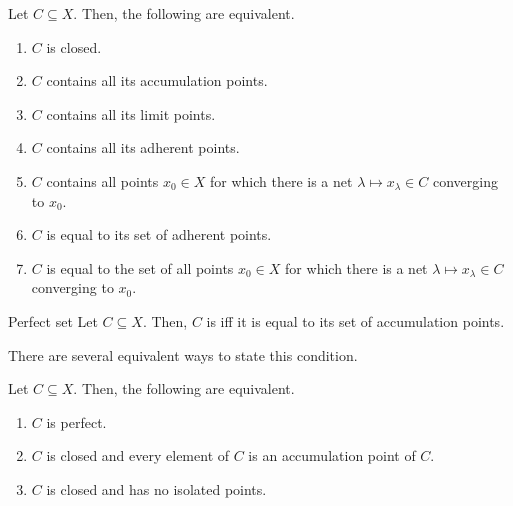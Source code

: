 \begin{thm}{}{}
Let $C\subseteq X$.  Then, the following are equivalent.
\begin{enumerate}
\item $C$ is closed.
\item $C$ contains all its accumulation points.
\item $C$ contains all its limit points.
\item $C$ contains all its adherent points.
\item $C$ contains all points $x_0\in X$ for which there is a net $\lambda \mapsto x_{\lambda}\in C$ converging to $x_0$.
\item $C$ is equal to its set of adherent points.
\item $C$ is equal to the set of all points $x_0\in X$ for which there is a net $\lambda \mapsto x_{\lambda}\in C$ converging to $x_0$.
\end{enumerate}
\end{thm}
\begin{dfn}{Perfect set}{}
Let $C\subseteq X$.  Then, $C$ is  iff it is equal to its set of accumulation points.
\end{dfn}
There are several equivalent ways to state this condition.
\begin{prp}{}{}
Let $C\subseteq X$.  Then, the following are equivalent.
\begin{enumerate}
\item $C$ is perfect.
\item $C$ is closed and every element of $C$ is an accumulation point of $C$.
\item $C$ is closed and has no isolated points.
\end{enumerate}
\end{prp}

